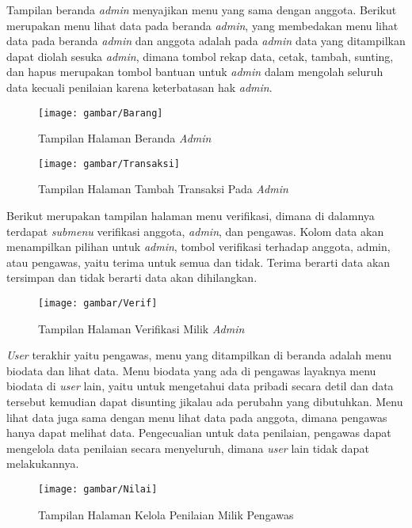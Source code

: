 Tampilan beranda \emph{admin} menyajikan menu yang sama dengan anggota. Berikut merupakan menu lihat data pada beranda \emph{admin}, yang membedakan menu lihat data pada beranda \emph{admin} dan anggota adalah pada \emph{admin} data yang ditampilkan dapat diolah sesuka \emph{admin}, dimana tombol rekap data, cetak, tambah, sunting, dan hapus merupakan tombol bantuan untuk \emph{admin} dalam mengolah seluruh data kecuali penilaian karena keterbatasan hak \emph{admin}.

\begin{figure}[H]
	\centering
	\texttt{[image: gambar/Barang]}
	\caption{Tampilan Halaman Beranda \emph{Admin}}
\end{figure}

\begin{figure}[H]
	\centering
	\texttt{[image: gambar/Transaksi]}
	\caption{Tampilan Halaman Tambah Transaksi Pada \emph{Admin}}
\end{figure}

Berikut merupakan tampilan halaman menu verifikasi, dimana di dalamnya terdapat \emph{submenu} verifikasi anggota, \textit{admin}, dan pengawas. Kolom data akan menampilkan pilihan untuk \emph{admin}, tombol verifikasi terhadap anggota, admin, atau pengawas, yaitu terima untuk semua dan tidak. Terima berarti data akan tersimpan dan tidak berarti data akan dihilangkan.

\begin{figure}[H]
	\centering
	\texttt{[image: gambar/Verif]}
	\caption{Tampilan Halaman Verifikasi Milik \emph{Admin}}
\end{figure}

\textit{User} terakhir yaitu pengawas, menu yang ditampilkan di beranda adalah menu biodata dan lihat data. Menu biodata yang ada di pengawas layaknya menu biodata di \textit{user} lain, yaitu untuk mengetahui data pribadi secara detil dan data tersebut kemudian dapat disunting jikalau ada perubahn yang dibutuhkan. Menu lihat data juga sama dengan menu lihat data pada anggota, dimana pengawas hanya dapat melihat data. Pengecualian untuk data penilaian, pengawas dapat mengelola data penilaian secara menyeluruh, dimana \textit{user} lain tidak dapat melakukannya.

\begin{figure}[H]
	\centering
	\texttt{[image: gambar/Nilai]}
	\caption{Tampilan Halaman Kelola Penilaian Milik Pengawas}
\end{figure} 

